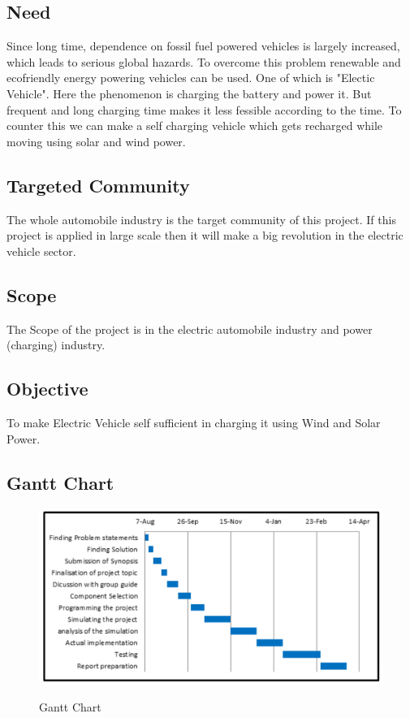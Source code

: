 \documentclass[a4paper,12pt]{article}
\begin{document}
\subsection{Need}
Since long time, dependence on fossil fuel powered vehicles is largely increased, which leads to serious global hazards. To overcome this problem renewable and ecofriendly energy powering vehicles can be used. One of which is "Electic Vehicle". Here the phenomenon is charging the battery and power it. But frequent and long charging time makes it less fessible according to the time. To counter this we can make a self charging vehicle which gets recharged while moving using solar and wind power.

\subsection{Targeted Community}
The whole automobile industry is the target community of this project. If this project is applied in large scale then it will make a big revolution in the electric vehicle sector.

\subsection{Scope}
The Scope of the project is in the electric automobile industry and power (charging) industry.

\subsection{Objective}
To make Electric Vehicle self sufficient in charging it using Wind and Solar Power.

\newpage
\subsection{Gantt Chart}
\begin{figure}[!h]
\centering
\includegraphics[scale=0.5]{gc.png}\\
\caption{Gantt Chart}
\end{figure}
\end{document}
